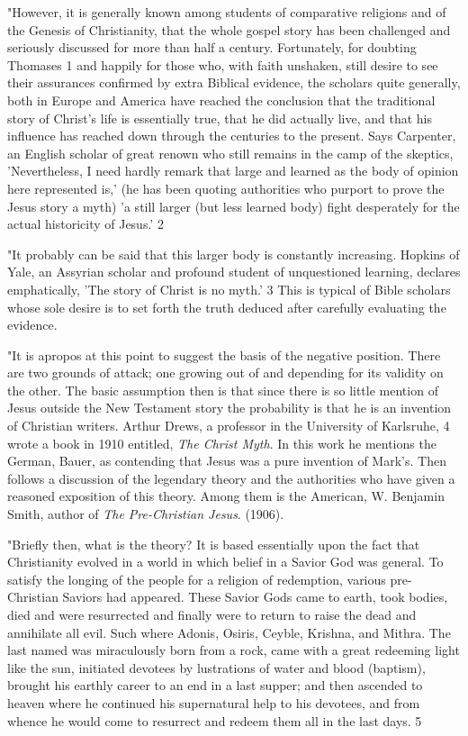 "However, it is generally known among students of comparative religions and of the Genesis
of Christianity, that the whole gospel story has been challenged and seriously discussed for
more than half a century. Fortunately, for doubting Thomases 1 and happily for those who,
with faith unshaken, still desire to see their assurances confirmed by extra Biblical evidence,
the scholars quite generally, both in Europe and America have reached the conclusion that
the traditional story of Christ's life is essentially true, that he did actually live, and that his
influence has reached down through the centuries to the present. Says Carpenter, an English
scholar of great renown who still remains in the camp of the skeptics, 'Nevertheless, I need
hardly remark that large and learned as the body of opinion here represented is,' (he has been
quoting authorities who purport to prove the Jesus story a myth) 'a still larger (but less
learned body) fight desperately for the actual historicity of Jesus.' 2

"It probably can be said that this larger body is constantly increasing. Hopkins of Yale, an
Assyrian scholar and profound student of unquestioned learning, declares emphatically, 'The
story of Christ is no myth.' 3 This is typical of Bible scholars whose sole desire is to set forth
the truth deduced after carefully evaluating the evidence.

"It is apropos at this point to suggest the basis of the negative position. There are two
grounds of attack; one growing out of and depending for its validity on the other. The basic
assumption then is that since there is so little mention of Jesus outside the New Testament
story the probability is that he is an invention of Christian writers. Arthur Drews, a professor
in the University of Karlsruhe, 4 wrote a book in 1910 entitled, \textit{The Christ Myth}. In this work
he mentions the German, Bauer, as contending that Jesus was a pure invention of Mark's.
Then follows a discussion of the legendary theory and the authorities who have given a
reasoned exposition of this theory. Among them is the American, W. Benjamin Smith, author
of \textit{The Pre-Christian Jesus}. (1906).

"Briefly then, what is the theory? It is based essentially upon the fact that Christianity
evolved in a world in which belief in a Savior God was general. To satisfy the longing of the
people for a religion of redemption, various pre-Christian Saviors had appeared. These
Savior Gods came to earth, took bodies, died and were resurrected and finally were to return
to raise the dead and annihilate all evil. Such where Adonis, Osiris, Ceyble, Krishna, and
Mithra. The last named was miraculously born from a rock, came with a great redeeming
light like the sun, initiated devotees by lustrations of water and blood (baptism), brought his
earthly career to an end in a last supper; and then ascended to heaven where he continued his
supernatural help to his devotees, and from whence he would come to resurrect and redeem
them all in the last days. 5

